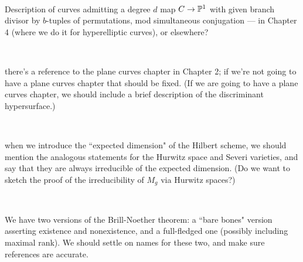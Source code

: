 \documentclass[12pt, leqno]{book}
\begin{document}
\

Description of curves admitting a degree $d$ map $C \to {\mathbb P}^1$ with given branch divisor by $b$-tuples of permutations, mod simultaneous conjugation --- in Chapter 4 (where we do it for hyperelliptic curves), or elsewhere?

\

there's a reference to the plane curves chapter in Chapter 2; if we're not going to have a plane curves chapter that should be fixed. (If we are going to have a plane curves chapter, we should include a brief description of the discriminant hypersurface.)

\

when we introduce the ``expected dimension" of the Hilbert scheme, we should mention the analogous statements for the Hurwitz space and Severi varieties, and say that they are always irreducible of the expected dimension. (Do we want to sketch the proof of the irreducibility of $M_g$ via Hurwitz spaces?)

\

We have two versions of the Brill-Noether theorem: a ``bare bones" version asserting existence and nonexistence, and a full-fledged one (possibly including maximal rank). We should settle on names for these two, and make sure references are accurate.
\end{document}
